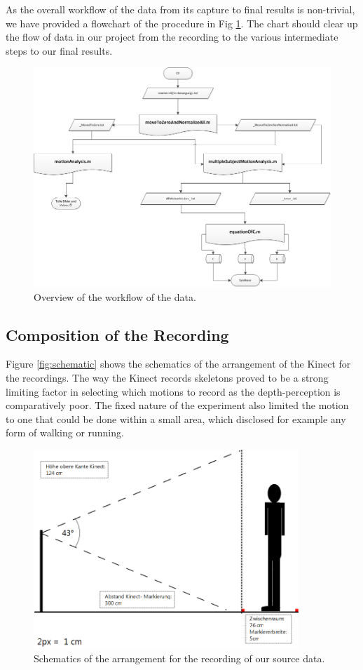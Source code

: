 \documentclass[a4paper]{article}
\begin{document}
As the overall workflow of the data from its capture to final results is non-trivial, we have provided a flowchart of the procedure in Fig \ref{fig:workflow}.
The chart should clear up the flow of data in our project from the recording to the various intermediate steps to our final results.

\begin{figure}
	\centering
	\includegraphics[width=14cm]{matlabaufbau.png}
	\caption{Overview of the workflow of the data.}
	\label{fig:workflow}
\end{figure}

\subsection{Composition of the Recording}

Figure \ref{fig:schematic} shows the schematics of the arrangement of the Kinect for the recordings.
The way the Kinect records skeletons proved to be a strong limiting factor in selecting which motions to record as the depth-perception is comparatively poor.
The fixed nature of the experiment also limited the motion to one that could be done within a small area, which disclosed for example any form of walking or running.

\begin{figure}
	\centering
	\includegraphics[width=10cm]{Aufbauohnelizenz.png}
	\caption{Schematics of the arrangement for the recording of our source data.}
	\label{fig:Aufbauohnelizenz}
\end{figure}
\end{document}
